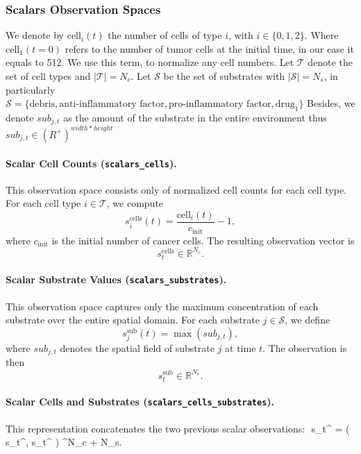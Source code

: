 \documentclass{article}
\begin{document}
\subsubsection{Scalars Observation Spaces}
 We denote by $\text{cell}_i(t)$ the number of cells of type $i$, with $i \in \{0,1,2\}$. Where $\text{cell}_1(t=0)$ refers to the number of tumor cells at the initial time, in our case it equals to 512. We use this term, to normalize any cell numbers.
 Let $\mathcal{T}$ denote the set of cell types and $|\mathcal{T}| = N_c$.
 Let $\mathcal{S}$ be the set of substrates with $|\mathcal{S}| = N_s$, in particularly $\mathcal{S} = \{\text{debris}, \text{anti-inflammatory factor}, \text{pro-inflammatory factor}, \text{drug}_1\}$
 Besides, we denote $sub_{j,t}$ as the amount of the substrate in the entire environment thus $sub_{j,t}\in (R^{+})^{width*height}$
 
\paragraph{Scalar Cell Counts (\texttt{scalars\_cells}).}
This observation space consists only of normalized cell counts for each cell type.
For each cell type $i \in \mathcal{T}$, we compute
$$
s^{\text{cells}}_i(t) = \frac{\text{cell}_i(t)}{c_{\text{init}}} - 1,
$$
where $c_{\text{init}}$ is the initial number of cancer cells.
The resulting observation vector is
$$
s_t^{\text{cells}} \in \mathbb{R}^{N_c}.
$$

\paragraph{Scalar Substrate Values (\texttt{scalars\_substrates}).}
This observation space captures only the maximum concentration of each substrate over the entire spatial domain.
For each substrate $j \in \mathcal{S}$, we define
$$
s^{\text{sub}}_j(t) = \max\left(sub_{j,t}\right),
$$
where $sub_{j,t}$ denotes the spatial field of substrate $j$ at time $t$.
The observation is then
$$
s_t^{\text{sub}} \in \mathbb{R}^{N_s}.
$$

\paragraph{Scalar Cells and Substrates (\texttt{scalars\_cells\_substrates}).}
This representation concatenates the two previous scalar observations:
$$
s_t^{} =
\left(
s_t^{},\;
s_t^{}
\right)
\in {}^{N_c + N_s}.
\end{document}
